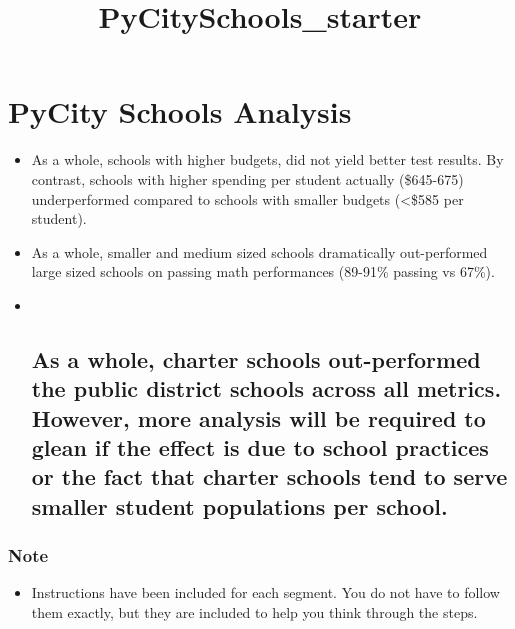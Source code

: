 \documentclass[11pt]{article}
\title{PyCitySchools\_starter}
\providecommand{\tightlist}{%
      \setlength{\itemsep}{0pt}\setlength{\parskip}{0pt}}
\begin{document}
    
    
    \maketitle
    
    

    
    \section{PyCity Schools Analysis}\label{pycity-schools-analysis}

\begin{itemize}
\item
  As a whole, schools with higher budgets, did not yield better test
  results. By contrast, schools with higher spending per student
  actually (\$645-675) underperformed compared to schools with smaller
  budgets (\textless{}\$585 per student).
\item
  As a whole, smaller and medium sized schools dramatically
  out-performed large sized schools on passing math performances
  (89-91\% passing vs 67\%).
\item ~
  \subsection{As a whole, charter schools out-performed the public
  district schools across all metrics. However, more analysis will be
  required to glean if the effect is due to school practices or the fact
  that charter schools tend to serve smaller student populations per
  school.}\label{as-a-whole-charter-schools-out-performed-the-public-district-schools-across-all-metrics.-however-more-analysis-will-be-required-to-glean-if-the-effect-is-due-to-school-practices-or-the-fact-that-charter-schools-tend-to-serve-smaller-student-populations-per-school.}
\end{itemize}

    \subsubsection{Note}\label{note}

\begin{itemize}
\tightlist
\item
  Instructions have been included for each segment. You do not have to
  follow them exactly, but they are included to help you think through
  the steps.
\end{itemize}
\end{document}
